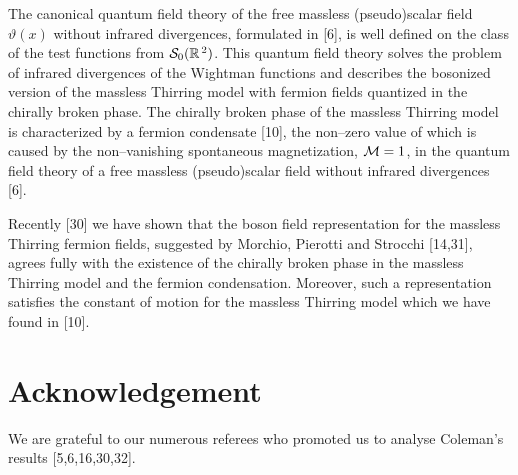 \documentclass[a4paper,12pt] {article}
\begin{document}
The canonical quantum field theory of the free massless (pseudo)scalar
field $\vartheta(x)$ without infrared divergences, formulated in [6],
is well defined on the class of the test functions from ${\cal
S}_0(\mathbb{R}^{\,2})$. This quantum field theory solves the problem
of infrared divergences of the Wightman functions and describes the
bosonized version of the massless Thirring model with fermion fields
quantized in the chirally broken phase. The chirally broken phase of
the massless Thirring model is characterized by a fermion condensate
[10], the non--zero value of which is caused by the non--vanishing
spontaneous magnetization, ${\cal M} = 1$, in the quantum field theory
of a free massless (pseudo)scalar field without infrared divergences
[6].

Recently [30] we have shown that the boson field representation for
the massless Thirring fermion fields, suggested by Morchio, Pierotti
and Strocchi [14,31], agrees fully with the existence of the chirally
broken phase in the massless Thirring model and the fermion
condensation. Moreover, such a representation satisfies the constant
of motion for the massless Thirring model which we have found in [10].

\section*{Acknowledgement}

\hspace{0.2in} We are grateful to our numerous referees who promoted
us to analyse Coleman's results [5,6,16,30,32].

\newpage
\end{document}
